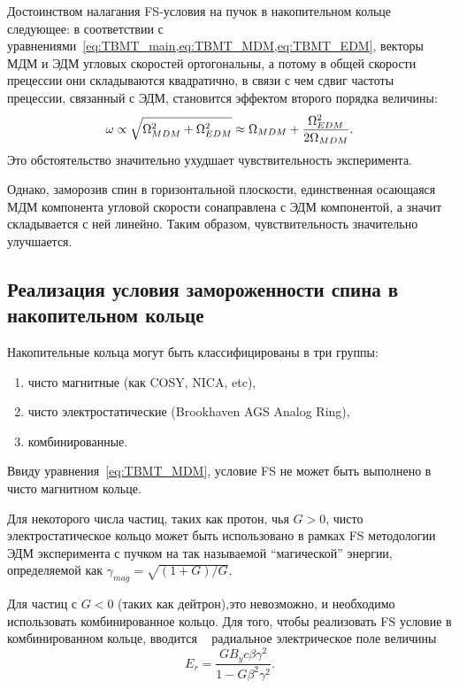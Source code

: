 \documentclass{report}
\begin{document}
Достоинством налагания FS-условия на пучок в накопительном кольце
следующее: в соответствии с
уравнениями~\cref{eq:TBMT_main,eq:TBMT_MDM,eq:TBMT_EDM}, векторы МДМ и
ЭДМ угловых скоростей ортогональны, а потому в общей скорости
прецессии они складываются квадратично, в связи с чем сдвиг частоты
прецессии, связанный с ЭДМ, становится эффектом второго порядка
величины:~\citep[стр.~5]{Mane:SpinWheel}
\[
\omega \propto \sqrt{\Omega_{MDM}^2 + \Omega_{EDM}^2} \approx \Omega_{MDM} + \frac{\Omega_{EDM}^2}{2\Omega_{MDM}}.
\]
Это обстоятельство значительно ухудшает чувствительность эксперимента.

Однако, заморозив спин в горизонтальной плоскости, единственная
осающаяся МДМ компонента угловой скорости сонаправлена с ЭДМ
компонентой, а значит складывается с ней линейно. Таким образом,
чувствительность значительно улучшается.

\subsection{Реализация условия замороженности спина в накопительном кольце}\label{sec:FS_in_SR}
Накопительные кольца могут быть классифицированы в три группы:
\begin{enumerate}
\item чисто магнитные (как COSY, NICA, etc),
\item чисто электростатические (Brookhaven AGS Analog Ring),
\item комбинированные.
\end{enumerate}

Ввиду уравнения~\eqref{eq:TBMT_MDM}, условие FS не может быть
выполнено в чисто магнитном кольце.

Для некоторого числа частиц, таких как протон, чья $G>0$, чисто
электростатическое кольцо может быть использовано в рамках FS
методологии ЭДМ эксперимента с пучком на так называемой ``магической''
энергии, определяемой как $\gamma_{mag} = \sqrt{(1+G)/G}$.

Для частиц с $G<0$ (таких как дейтрон),это невозможно, и необходимо
использовать комбинированное кольцо. Для того, чтобы реализовать FS
условие в комбинированном кольце, вводится ~\cite{BNL:Deuteron2008} радиальное электрическое
поле величины
\begin{equation}\label{eq:FS_Er}
  E_r = \frac{GB_yc\beta\gamma^2}{1-G\beta^2\gamma^2}.
\end{equation}
\end{document}
